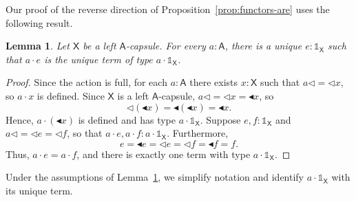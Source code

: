 \documentclass{amsart}
\newcommand{\tin}{:}
\newcommand{\Cat}[1]{\mathsf{#1}}
\newcommand{\cat}[1]{\Cat{#1}}
\newcommand{\acat}[1]{\mathsf{#1}}
\newcommand{\Caps}[1]{\mathsf{#1}}
\numberwithin{lstfloat}{section}
\newcommand{\tgtfunc}{\mathbin{\blacktriangleleft}}
\newcommand{\tgt}[1]{\tgtfunc #1}
\newcommand{\one}{\mathbb{1}}
\newcommand{\cA}{\cat{A}}
\newcommand{\aX}{\Caps{X}}
\newtheorem{lem}[thm]{Lemma}
\theoremstyle{definition}
\theoremstyle{remark}
\numberwithin{equation}{section}
\begin{document}
Our proof of the reverse direction of  Proposition~\ref{prop:functors-are} uses
the following result.\enlargethispage{0.3cm}

\begin{lem}
  \label{lem:unique-identity}
  Let $\acat{X}$ be a left $\acat{A}$-capsule. For every $a\tin \cA$, there is a unique
  $e:\one_{\aX}$ such that $a\cdot e$ is the unique term of type
  $a\cdot\one_{\aX}$.
\end{lem}

\begin{proof}
  Since the action is full, for each $a\tin \acat{A}$ there exists
  $x\tin\aX$ such that $a\lhd = \lhd x$, so $a\cdot x$ is defined.
  Since $\acat{X}$ is a left $\acat{A}$-capsule, $a\lhd = \lhd x = \tgt{x}$, so
  \[
    \lhd(\tgt{x})=\tgt{(\tgt{x})}=\tgt{x}.
  \]
  Hence, $a\cdot (\tgt{x})$ is defined and has type $a\cdot \one_{\aX}$.
  Suppose $e,f\tin\one_{\acat{X}}$ and $a\lhd = \lhd e = \lhd f$, so that
  $a\cdot e, a\cdot f \tin a\cdot \one_{\aX}$.  Furthermore, 
  \[
    e = \tgt{e} = \lhd e = \lhd f = \tgt{f} = f.
  \] 
  Thus, $a\cdot e = a\cdot f$, and there is exactly one term with type $a\cdot
  \one_{\aX}$.
\end{proof}

Under the assumptions of Lemma~\ref{lem:unique-identity}, we simplify notation and
identify $a\cdot \one_{\acat{X}}$ with its unique term. 
\end{document}
